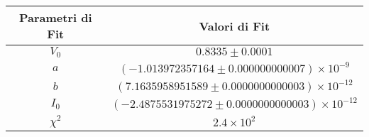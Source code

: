\begin{tabular}{cc}
\hline
	Parametri di Fit & Valori di Fit\\ 
\hline
	$V_0$ & $0.8335\pm0.0001$ \\
	$a$ & $(-1.013972357164\pm0.000000000007)\times 10^{-9}$ \\
	$b$ & $(7.1635958951589\pm0.0000000000003)\times 10^{-12}$ \\
	$I_0$ & $(-2.4875531975272\pm0.0000000000003)\times 10^{-12}$ \\
	$\chi^2$ & $2.4\times 10^{2}$ \\
\hline
\end{tabular}
